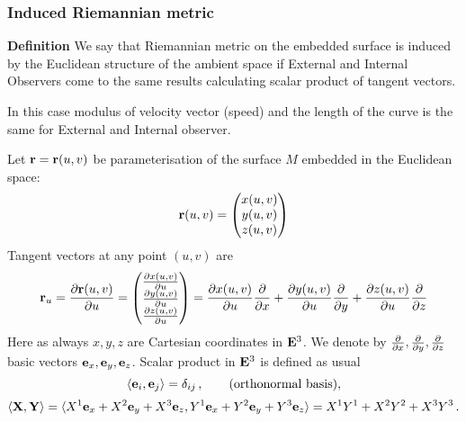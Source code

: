 \documentclass[12pt]{article}
\theoremstyle{theorem}
\numberwithin{equation}{section}
\begin{document}
\subsubsection {Induced Riemannian metric}

 {\bf Definition}  We say that Riemannian metric on the embedded surface is induced by the Euclidean structure of the ambient space
    if External and Internal Observers come to the same results calculating scalar product of tangent vectors.

    In this case modulus of velocity vector (speed) and the length of the curve is the same for
    External and Internal observer.



    Let ${\bf r}={\bf r}(u,v)$ be parameterisation of the surface $M$ embedded in the Euclidean space:
                           \begin{equation*}
                            {\bf r}(u,v)=\begin{pmatrix}x(u,v)\cr
                              y(u,v)\cr
                              z(u,v)\cr
                              \end{pmatrix}
                           \end{equation*}
       Tangent vectors at any point $(u,v)$
   are
              \begin{equation*}
                {\bf r}_u={\partial {\bf r}(u,v)\over \partial u}=\begin{pmatrix}
                              {\partial x(u,v)\over \partial u}\cr
                              {\partial y(u,v)\over \partial u}\cr
                              {\partial z(u,v)\over \partial u}\cr
                              \end{pmatrix}=
                              {\partial x(u,v)\over \partial u}{\partial\over \partial x}+
                              {\partial y(u,v)\over \partial u}{\partial\over \partial y}+
                              {\partial z(u,v)\over \partial u}{\partial\over \partial z}
              \end{equation*}
Here as always $x,y,z$ are Cartesian coordinates in ${\bf E}^3$. We denote by
${\partial\over \partial x},{\partial\over \partial y},{\partial\over \partial z}$ basic vectors ${\bf e}_x,{\bf e}_y,{\bf e}_z$.  Scalar product
in ${\bf E}^3$ is defined as usual
\begin{equation*}
    \langle{\bf e}_i,{\bf e}_j\rangle=\delta_{ij}\,,\qquad\hbox{(orthonormal basis)},
    \end{equation*}
\begin{equation}\label{scalarproductinE^3}
    \langle{\bf X},{\bf Y}\rangle=\langle X^1{\bf e}_x+X^2{\bf e}_y+X^3{\bf e}_z, Y^1{\bf e}_x+Y^2{\bf e}_y+Y^3{\bf e}_z\rangle=
    X^1Y^1+X^2Y^2+X^3Y^3\,.
\end{equation}
\end{document}
